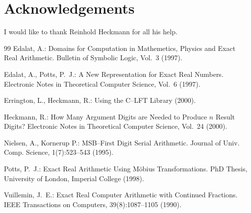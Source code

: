 \documentclass[11pt,a4paper]{article}
\begin{document}
\section*{Acknowledgements}
I would like to thank Reinhold Heckmann for all his help.


\begin{thebibliography}{99}
     Edalat, A.:
    Domains for Computation in Mathemetics, Physics and Exact
    Real Arithmetic.
    Bulletin of Symbolic Logic, Vol.~3 (1997).

     Edalat, A., Potts, P.~J.:
    A New Representation for Exact Real Numbers.
    Electronic Notes in Theoretical Computer Science, Vol.~6 (1997).

     Errington, L., Heckmann, R.:
    Using the C--LFT Library (2000).

     Heckmann, R.:
    How Many Argument Digits are Needed to Produce $n$
    Result Digits? Electronic Notes in Theoretical Computer Science,
		Vol.~24 (2000).

    Nielsen, A., Kornerup P.:
    MSB--First Digit Serial Arithmetic.
    Journal of Univ. Comp. Science, 1(7):523--543 (1995).

     Potts, P.~J.:
    Exact Real Arithmetic Using M\"obius Transformations.
    PhD Thesis, University of London, Imperial College (1998).

     Vuillemin, J.~E.:
    Exact Real Computer Arithmetic with Continued Fractions.
    IEEE Transactions on Computers, 39(8):1087--1105 (1990).
\end{thebibliography}

	
\end{document}
